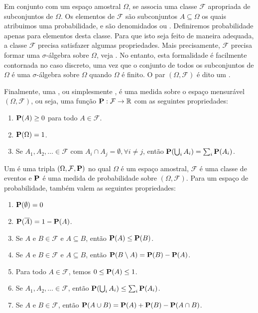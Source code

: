 Em conjunto com um espaço amostral $\Omega$, se associa uma classe $\mathcal{F}$ apropriada de subconjuntos de $\Omega$. Os elementos de $\mathcal{F}$ são subconjuntos $A \subseteq \Omega$ os quais atribuimos uma probabilidade, e são denomidados  ou . Definiremos probabilidade apenas para elementos desta classe. Para que isto seja feito de maneira adequada, a classe $\mathcal{F}$ precisa satisfazer algumas propriedades. Mais precisamente, $\mathcal{F}$ precisa formar uma $\sigma$-álgebra sobre $\Omega$, veja \cite{barryjames}.
No entanto, esta formalidade é facilmente contornada no caso discreto, uma vez que o conjunto de todos os subconjuntos de $\Omega$ é uma $\sigma$-álgebra sobre $\Omega$ quando $\Omega$ é finito. O par $(\Omega, \mathcal{F})$ é dito um .

Finalmente, uma , ou simplesmente , é uma medida sobre o espaço mensurável $(\Omega, \mathcal{F})$, ou seja, uma função $\operatorname{\mathbf{P}} : \mathcal{F} \to \mathbb{R}$ com as seguintes propriedades:

\begin{enumerate}[label=(P\arabic*),itemindent=*]
  \item $\operatorname{\mathbf{P}}(A) \geq 0$ para todo $A \in \mathcal{F}$.
  \item $\operatorname{\mathbf{P}}(\Omega) = 1$.
  \item Se $A_1, A_2, \dots \in \mathcal{F}$ com $A_i \cap A_j = \emptyset, \forall i \neq j$, então $\operatorname{\mathbf{P}}( \bigcup_{i} A_i ) = \sum_i \operatorname{\mathbf{P}}(A_i)$.
\end{enumerate}

Um  é uma tripla $(\Omega, \mathcal{F}, \operatorname{\mathbf{P}})$ no qual $\Omega$ é um espaço amostral, $\mathcal{F}$ é uma classe de eventos e $\operatorname{\mathbf{P}}$ é uma medida de probabilidade sobre $(\Omega, \mathcal{F})$. Para um espaço de probabilidade, também valem as seguintes propriedades:

\begin{enumerate}[label=\arabic*.,itemindent=*]
  \item $\operatorname{\mathbf{P}}(\emptyset) = 0$
  \item $\operatorname{\mathbf{P}}(\overline{A}) = 1 - \operatorname{\mathbf{P}}(A)$.
  \item Se $A$ e $B \in \mathcal{F}$ e $A \subseteq B$, então $\operatorname{\mathbf{P}}(A) \leq \operatorname{\mathbf{P}}(B)$.
  \item Se $A$ e $B \in \mathcal{F}$ e $A \subseteq B$, então $\operatorname{\mathbf{P}}(B \setminus A) = \operatorname{\mathbf{P}}(B) - \operatorname{\mathbf{P}}(A)$.
  \item Para todo $A \in \mathcal{F}$, temos $0 \leq \operatorname{\mathbf{P}}(A) \leq 1$.
  \item Se $A_1, A_2, \dots \in \mathcal{F}$, então $\operatorname{\mathbf{P}}( \bigcup_{i} A_i ) \leq \sum_i \operatorname{\mathbf{P}}(A_i)$.
  \item Se $A$ e $B \in \mathcal{F}$, então $\operatorname{\mathbf{P}}(A \cup B) = \operatorname{\mathbf{P}}(A) + \operatorname{\mathbf{P}}(B) - \operatorname{\mathbf{P}}(A \cap B)$.
\end{enumerate}

